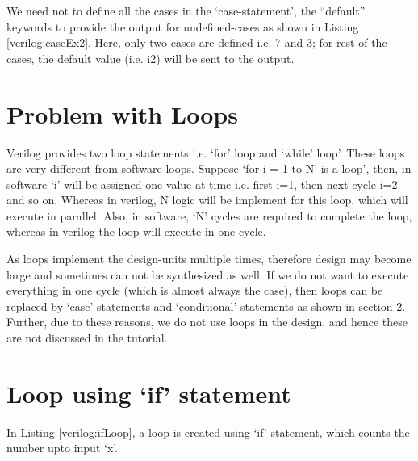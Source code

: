 We need not to define all the cases in the `case-statement', the ``default'' keywords to provide the output for undefined-cases as shown in Listing \ref{verilog:caseEx2}. Here, only two cases are defined i.e. 7 and 3; for rest of the cases, the default value (i.e. i2) will be sent to the output. 



\section{Problem with Loops}

Verilog provides two loop statements i.e. `for' loop and `while' loop'. These loops are very different from software loops. Suppose `for i = 1 to N' is a loop', then, in software `i' will be assigned one value at time i.e. first i=1, then next cycle i=2 and so on. Whereas in verilog, N logic will be implement for this loop, which will execute in parallel. Also, in software, `N' cycles are required to complete the loop, whereas in verilog the loop will execute in one cycle. 
\begin{noNumBox}
	As loops implement the design-units multiple times, therefore design may become large and sometimes can not be synthesized as well. If we do not want to execute everything in one cycle (which is almost always the case), then loops can be replaced by `case' statements and `conditional' statements as shown in section \ref{sec:ifLoop}. Further, due to these reasons, we do not use loops in the design, and hence these are not discussed in the tutorial.
\end{noNumBox}   
%
\section{Loop using `if' statement}\label{sec:ifLoop}
In Listing \ref{verilog:ifLoop}, a loop is created using `if' statement, which counts the number upto input `x'. 

